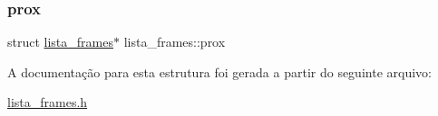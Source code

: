 \mbox{\label{structlista__frames_ac33c75b9e66a517b493e6d35a3c1efb3}} 
\subsubsection{\texorpdfstring{prox}{prox}}
{\footnotesize\ttfamily struct \hyperlink{structlista__frames}{lista\+\_\+frames}$\ast$ lista\+\_\+frames\+::prox}



A documentação para esta estrutura foi gerada a partir do seguinte arquivo\+:\begin{DoxyCompactItemize}
\item 
\hyperlink{lista__frames_8h}{lista\+\_\+frames.\+h}\end{DoxyCompactItemize}
